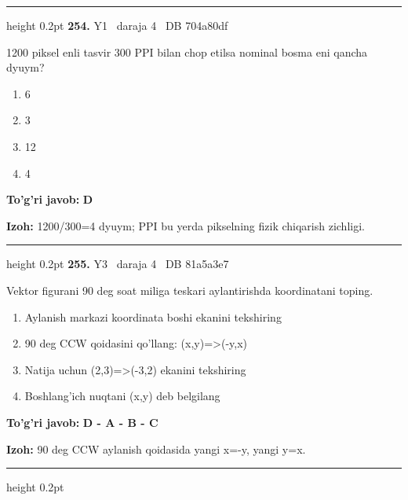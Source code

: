 \documentclass[10pt,a4paper,oneside]{article}
\begin{document}
\vspace{2mm}\hrule height 0.2pt \vspace{4mm}
\hypertarget{q254}{\textbf{\color{ink}254.}}  {\color{muted}\scriptsize Y1 \textbullet\ daraja 4 \textbullet\ DB 704a80df}
\par
1200 piksel enli tasvir 300 PPI bilan chop etilsa nominal bosma eni qancha dyuym?
\begin{enumerate}[label=\Alph*),leftmargin=9mm]
\item 6
\item 3
\item 12
\item 4
\end{enumerate}
\begin{tcolorbox}[enhanced,breakable,colback=teal!4,colframe=teal!45!black,boxrule=0.45pt,arc=1.2mm,left=2.8mm,right=2.8mm,top=2mm,bottom=2mm,before skip=2mm,after skip=2mm]
\textbf{\color{teal}To'g'ri javob:} \textbf{D}
\par\smallskip
\textbf{Izoh:} 1200/300=4 dyuym; PPI bu yerda pikselning fizik chiqarish zichligi.
\end{tcolorbox}
\vspace{2mm}\hrule height 0.2pt \vspace{4mm}
\hypertarget{q255}{\textbf{\color{ink}255.}}  {\color{muted}\scriptsize Y3 \textbullet\ daraja 4 \textbullet\ DB 81a5a3e7}
\par
Vektor figurani 90 deg  soat miliga teskari aylantirishda koordinatani toping.
\begin{enumerate}[label=\Alph*),leftmargin=9mm]
\item Aylanish markazi koordinata boshi ekanini tekshiring
\item 90 deg  CCW qoidasini qo'llang: (x,y)=\textgreater{}(-y,x)
\item Natija uchun (2,3)=\textgreater{}(-3,2) ekanini tekshiring
\item Boshlang'ich nuqtani (x,y) deb belgilang
\end{enumerate}
\begin{tcolorbox}[enhanced,breakable,colback=teal!4,colframe=teal!45!black,boxrule=0.45pt,arc=1.2mm,left=2.8mm,right=2.8mm,top=2mm,bottom=2mm,before skip=2mm,after skip=2mm]
\textbf{\color{teal}To'g'ri javob:} \textbf{D - A - B - C}
\par\smallskip
\textbf{Izoh:} 90 deg  CCW aylanish qoidasida yangi x=-y, yangi y=x.
\end{tcolorbox}
\vspace{2mm}\hrule height 0.2pt \vspace{4mm}
\end{document}

